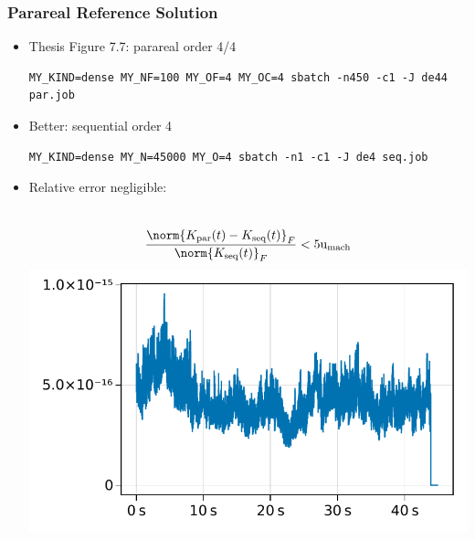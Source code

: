 \begin{frame}[fragile]
  \frametitle{Parareal Reference Solution}
  \begin{itemize}
    \item
      Thesis Figure 7.7: parareal order 4/4

      \begin{lstlisting}
MY_KIND=dense MY_NF=100 MY_OF=4 MY_OC=4 sbatch -n450 -c1 -J de44 par.job
      \end{lstlisting}
    \item
      Better: sequential order 4

      \begin{lstlisting}
MY_KIND=dense MY_N=45000 MY_O=4 sbatch -n1 -c1 -J de4 seq.job
      \end{lstlisting}
    \item
      Relative error negligible:
      \begin{minipage}{\linewidth}
      \begin{columns}[totalwidth=\linewidth]
        \begin{equation*}
          \frac{\norm{K_\text{par}(t) - K_\text{seq}(t)}_F}{\norm{K_\text{seq}(t)}_F}
          < 5\umach
        \end{equation*}
        \includegraphics[width=\textwidth]{figures/slides-seq-parareal-ref.pdf}
      \end{columns}
      \end{minipage}
  \end{itemize}
\end{frame}

